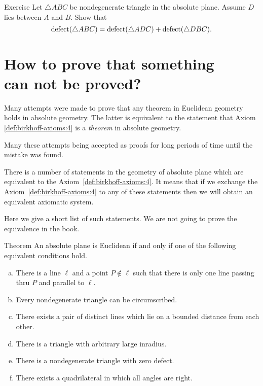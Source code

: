 \begin{thm}{Exercise}\label{ex:defect}
Let $\triangle ABC$ be nondegenerate triangle in the absolute plane.
Assume $D$ lies between $A$ and $B$.
Show that 
$$\mathop{\rm defect}\nolimits(\triangle ABC)=\mathop{\rm defect}\nolimits(\triangle ADC)+\mathop{\rm defect}\nolimits(\triangle DBC).$$

\end{thm}



\section*{How to prove that something\\ 
can not be proved?}

Many attempts were made to prove that any theorem in Euclidean geometry holds in absolute geometry.
The latter is equivalent to the statement that Axiom \ref{def:birkhoff-axioms:4} is a {}\emph{theorem} in absolute geometry.

Many these attempts being accepted as proofs for long periods of time until the mistake was found.

There is a number of statements in the geometry of absolute plane which are equivalent to the Axiom~\ref{def:birkhoff-axioms:4}.
It means that if we exchange the Axiom~\ref{def:birkhoff-axioms:4}  to any of these statements then we will obtain an equivalent axiomatic system.

Here we give a short list of such statements.
We are not going to prove the equivalence in the book.

\begin{thm}{Theorem}\label{thm:=IV}
An absolute plane is Euclidean if and only if one of the following equivalent conditions hold.
\begin{enumerate}[(a)]
\item\label{thm:=IV:main} 
There is a line $\ell$ 
and a point $P\notin\ell$ 
such that there is only one line passing thru $P$ 
and parallel to $\ell$.
\item 
Every nondegenerate triangle can be circumscribed.
\item
There exists a pair of distinct lines which lie on a bounded distance from each other.
\item
There is a triangle with arbitrary large inradius.
\item
There is a nondegenerate triangle with zero defect.
\item
There exists a quadrilateral in which all angles are right.
\end{enumerate}
\end{thm}

